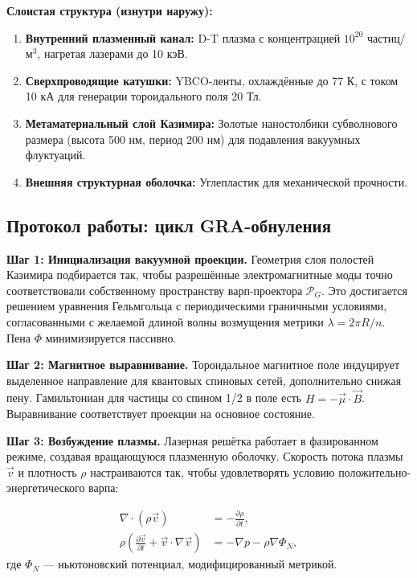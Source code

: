 \documentclass[11pt]{article}
\begin{document}
\textbf{Слоистая структура (изнутри наружу):}
\begin{enumerate}
    \item \textbf{Внутренний плазменный канал:} D-T плазма с концентрацией $10^{20}$ частиц/м$^3$, нагретая лазерами до 10 кэВ.
    \item \textbf{Сверхпроводящие катушки:} YBCO-ленты, охлаждённые до 77 К, с током 10 кА для генерации тороидального поля 20 Тл.
    \item \textbf{Метаматериальный слой Казимира:} Золотые наностолбики субволнового размера (высота 500 нм, период 200 нм) для подавления вакуумных флуктуаций.
    \item \textbf{Внешняя структурная оболочка:} Углепластик для механической прочности.
\end{enumerate}

\subsection{Протокол работы: цикл GRA-обнуления}

\textbf{Шаг 1: Инициализация вакуумной проекции.} Геометрия слоя полостей Казимира подбирается так, чтобы разрешённые электромагнитные моды точно соответствовали собственному пространству варп-проектора $\mathcal{P}_G$. Это достигается решением уравнения Гельмгольца с периодическими граничными условиями, согласованными с желаемой длиной волны возмущения метрики $\lambda = 2\pi R / n$. Пена $\Phi$ минимизируется пассивно.

\textbf{Шаг 2: Магнитное выравнивание.} Тороидальное магнитное поле индуцирует выделенное направление для квантовых спиновых сетей, дополнительно снижая пену. Гамильтониан для частицы со спином 1/2 в поле есть $H = -\vec{\mu} \cdot \vec{B}$. Выравнивание соответствует проекции на основное состояние.

\textbf{Шаг 3: Возбуждение плазмы.} Лазерная решётка работает в фазированном режиме, создавая вращающуюся плазменную оболочку. Скорость потока плазмы $\vec{v}$ и плотность $\rho$ настраиваются так, чтобы удовлетворять условию положительно-энергетического варпа:

\begin{align}
\nabla \cdot (\rho \vec{v}) &= -\frac{\partial \rho}{\partial t}, \\
\rho \left( \frac{\partial \vec{v}}{\partial t} + \vec{v} \cdot \nabla \vec{v} \right) &= -\nabla p - \rho \nabla \Phi_N,
\end{align}
где $\Phi_N$ — ньютоновский потенциал, модифицированный метрикой.
\end{document}
